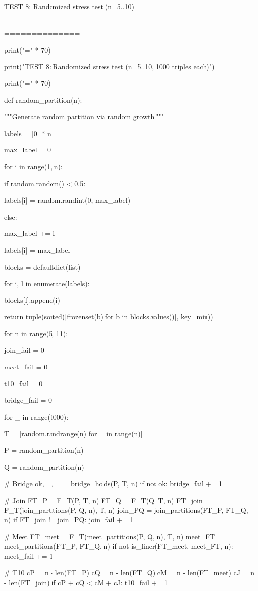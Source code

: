 TEST 8: Randomized stress test (n=5..10)


============================================================


print("=" * 70)

print("TEST 8: Randomized stress test (n=5..10, 1000 triples each)")

print("=" * 70)


def random_partition(n):

"""Generate random partition via random growth."""

labels = [0] * n

max_label = 0

for i in range(1, n):

if random.random() < 0.5:

labels[i] = random.randint(0, max_label)

else:

max_label += 1

labels[i] = max_label

blocks = defaultdict(list)

for i, l in enumerate(labels):

blocks[l].append(i)

return tuple(sorted([frozenset(b) for b in blocks.values()], key=min))


for n in range(5, 11):

join_fail = 0

meet_fail = 0

t10_fail = 0

bridge_fail = 0

for _ in range(1000):

T = [random.randrange(n) for _ in range(n)]

P = random_partition(n)

Q = random_partition(n)


    # Bridge  
    ok, _, _ = bridge_holds(P, T, n)  
    if not ok:  
        bridge_fail += 1  
      
    # Join  
    FT_P = F_T(P, T, n)  
    FT_Q = F_T(Q, T, n)  
    FT_join = F_T(join_partitions(P, Q, n), T, n)  
    join_PQ = join_partitions(FT_P, FT_Q, n)  
    if FT_join != join_PQ:  
        join_fail += 1  
      
    # Meet  
    FT_meet = F_T(meet_partitions(P, Q, n), T, n)  
    meet_FT = meet_partitions(FT_P, FT_Q, n)  
    if not is_finer(FT_meet, meet_FT, n):  
        meet_fail += 1  
      
    # T10  
    cP = n - len(FT_P)  
    cQ = n - len(FT_Q)  
    cM = n - len(FT_meet)  
    cJ = n - len(FT_join)  
    if cP + cQ < cM + cJ:  
        t10_fail += 1  
  
